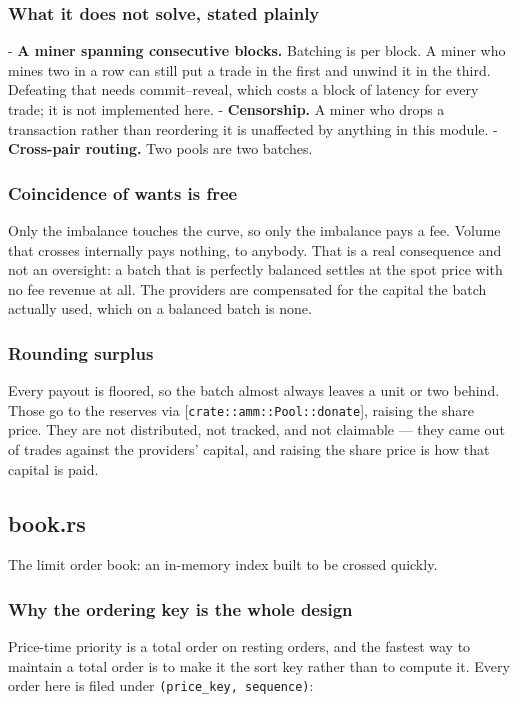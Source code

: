 \documentclass[11pt,a4paper]{article}
\begin{document}
\subsubsection{What it does not solve, stated plainly}

- \textbf{A miner spanning consecutive blocks.} Batching is per block. A miner
  who mines two in a row can still put a trade in the first and unwind it in
  the third. Defeating that needs commit–reveal, which costs a block of
  latency for every trade; it is not implemented here.
- \textbf{Censorship.} A miner who drops a transaction rather than reordering it
  is unaffected by anything in this module.
- \textbf{Cross-pair routing.} Two pools are two batches.

\subsubsection{Coincidence of wants is free}

Only the imbalance touches the curve, so only the imbalance pays a fee.
Volume that crosses internally pays nothing, to anybody. That is a real
consequence and not an oversight: a batch that is perfectly balanced settles
at the spot price with no fee revenue at all. The providers are compensated
for the capital the batch actually used, which on a balanced batch is none.

\subsubsection{Rounding surplus}

Every payout is floored, so the batch almost always leaves a unit or two
behind. Those go to the reserves via [\texttt{crate::amm::Pool::donate}], raising
the share price. They are not distributed, not tracked, and not claimable —
they came out of trades against the providers' capital, and raising the
share price is how that capital is paid.

\subsection{book.rs}
The limit order book: an in-memory index built to be crossed quickly.

\subsubsection{Why the ordering key is the whole design}

Price-time priority is a total order on resting orders, and the fastest way
to maintain a total order is to make it the sort key rather than to compute
it. Every order here is filed under \texttt{(price\_key, sequence)}:
\end{document}
